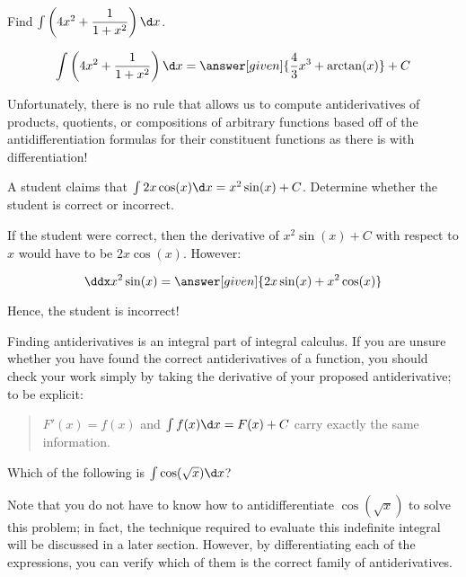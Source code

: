 \documentclass[nooutcomes]{ximera}
\begin{document}
\begin{question} 
  Find $\int \left(4x^2 + \dfrac{1}{1+x^2} \right)\d x$.
  \begin{prompt} 
    \[
    \int \left(4x^2 + \dfrac{1}{1+x^2} \right) \d x  = \answer[given]{\frac{4}{3} x^3 + \arctan(x)} +C 
    \]
  \end{prompt}
\end{question}



Unfortunately, there is no rule that allows us to compute antiderivatives of products, quotients, or compositions of arbitrary functions based off of the antidifferentiation formulas for their constituent functions as there is with differentiation!  


\begin{example}
  A student claims that $\int 2x \cos(x) \d x = x^2 \sin(x) +C$.  Determine whether the student is correct or incorrect.
  
  \begin{explanation}
    If the student were correct, then the derivative of $x^2 \sin(x) +C$ with respect to $x$ would have to be $2x \cos(x)$.  However:
    
      \[\ddx x^2 \sin(x) = \answer[given]{2x \sin(x) +x^2 \cos(x)} \]
      
 Hence, the student is incorrect!
  \end{explanation}
\end{example}

\begin{remark}
Finding antiderivatives is an integral part of integral calculus.  If you are unsure whether you have found the correct antiderivatives of a function, you should check your work simply by taking the derivative of your proposed antiderivative; to be explicit:

\begin{quote}
$F'(x) = f(x)$ and $\int f(x) \d x = F(x)+C$ carry exactly the same information.
\end{quote}
\end{remark}

\begin{question}
  Which of the following is $\int \cos(\sqrt{x}) \d x$?  
  \begin{selectAll}
  \end{selectAll}
 
 \begin{feedback}
 Note that you do not have to know how to antidifferentiate $\cos(\sqrt{x})$ to solve this problem; in fact, the technique required to evaluate this indefinite integral will be discussed in a later section.  However, by differentiating each of the expressions, you can verify which of them is the correct family of antiderivatives.
 \end{feedback}  
\end{question}
\end{document}
